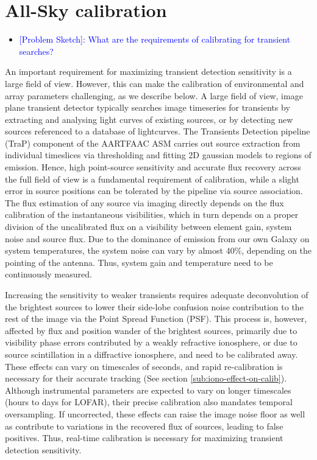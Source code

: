 \documentclass{aa}
\begin{document}
\section{\label{sec:Array-calibration-for}All-Sky calibration}
\begin{itemize}
\item \textcolor{blue}{{[}Problem Sketch{]}: What are the requirements of
calibrating for transient searches?}
\end{itemize}
An important requirement for maximizing transient detection sensitivity
is a large field of view. However, this can make the calibration of
environmental and array parameters challenging, as we describe below.
A large field of view, image plane transient detector typically searches
image timeseries for transients by extracting and analysing light
curves of existing sources, or by detecting new sources referenced
to a database of lightcurves. The Transients Detection pipeline (TraP)
\cite{swinbank2013trap} component of the AARTFAAC ASM carries out
source extraction from individual timeslices via thresholding and
fitting 2D gaussian models to regions of emission. Hence, high point-source
sensitivity and accurate flux recovery across the full field of view
is a fundamental requirement of calibration, while a slight error
in source positions can be tolerated by the pipeline via source association.
The flux estimation of any source via imaging directly depends on
the flux calibration of the instantaneous visibilities, which in turn
depends on a proper division of the uncalibrated flux on a visibility
between element gain, system noise and source flux. Due to the dominance
of emission from our own Galaxy on system temperatures, the system
noise can vary by almost $40\%$, depending on the pointing of the
antenna. Thus, system gain and temperature need to be continuously
measured. 

Increasing the sensitivity to weaker transients requires adequate
deconvolution of the brightest sources to lower their side-lobe confusion
noise contribution to the rest of the image via the Point Spread Function
(PSF). This process is, however, affected by flux and position wander
of the brightest sources, primarily due to visibility phase errors
contributed by a weakly refractive ionosphere, or due to source scintillation
in a diffractive ionosphere, and need to be calibrated away. These
effects can vary on timescales of seconds, and rapid re-calibration
is necessary for their accurate tracking (See section \ref{sub:iono-effect-on-calib}).
Although instrumental parameters are expected to vary on longer timescales
(hours to days for LOFAR), their precise calibration also mandates
temporal oversampling. If uncorrected, these effects can raise the
image noise floor as well as contribute to variations in the recovered
flux of sources, leading to false positives. Thus, real-time calibration
is necessary for maximizing transient detection sensitivity. 
\end{document}

